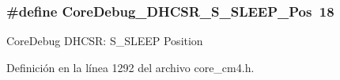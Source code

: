 \subsubsection[{\texorpdfstring{Core\+Debug\+\_\+\+D\+H\+C\+S\+R\+\_\+\+S\+\_\+\+S\+L\+E\+E\+P\+\_\+\+Pos}{CoreDebug_DHCSR_S_SLEEP_Pos}}]{\setlength{\rightskip}{0pt plus 5cm}\#define Core\+Debug\+\_\+\+D\+H\+C\+S\+R\+\_\+\+S\+\_\+\+S\+L\+E\+E\+P\+\_\+\+Pos~18}\hypertarget{group___c_m_s_i_s___core_debug_ga349ccea33accc705595624c2d334fbcb}{}\label{group___c_m_s_i_s___core_debug_ga349ccea33accc705595624c2d334fbcb}
Core\+Debug D\+H\+C\+SR\+: S\+\_\+\+S\+L\+E\+EP Position 

Definición en la línea 1292 del archivo core\+\_\+cm4.\+h.


